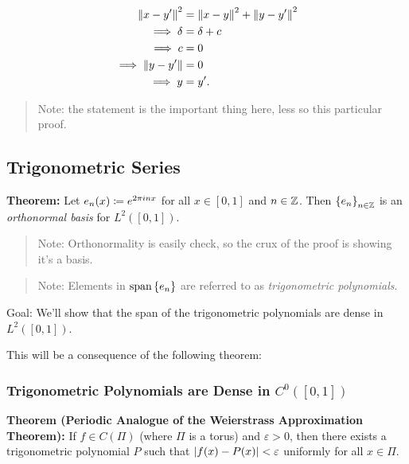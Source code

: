 \begin{align*}
{\left\lVert {x-y'} \right\rVert}^2 &= {\left\lVert {x-y} \right\rVert}^2 + {\left\lVert {y-y'} \right\rVert}^2 \\
\implies \delta &= \delta + c \\
\implies c &= 0 \\
\implies {\left\lVert {y-y'} \right\rVert} &= 0 \\
\implies y &= y'
.\end{align*}

\begin{quote}
Note: the statement is the important thing here, less so this particular
proof.
\end{quote}

\hypertarget{trigonometric-series}{%
\subsection{Trigonometric Series}\label{trigonometric-series}}

\textbf{Theorem:} Let \(e_n(x) \coloneqq e^{2\pi i n x}\) for all
\(x\in [0, 1]\) and \(n\in {\mathbb{Z}}\). Then \(\left\{{e_n}\right\}_{n\in {\mathbb{Z}}}\) is an
\emph{orthonormal basis} for \(L^2([0, 1])\).

\begin{quote}
Note: Orthonormality is easily check, so the crux of the proof is
showing it's a basis.
\end{quote}

\begin{quote}
Note: Elements in \(\mathrm{span}\left\{{e_n}\right\}\) are referred to as
\emph{trigonometric polynomials}.
\end{quote}

Goal: We'll show that the span of the trigonometric polynomials are
dense in \(L^2([0, 1])\).

This will be a consequence of the following theorem:

\hypertarget{trigonometric-polynomials-are-dense-in-c00-1}{%
\subsubsection{\texorpdfstring{Trigonometric Polynomials are Dense in
\(C^0([0, 1])\)}{Trigonometric Polynomials are Dense in C\^{}0({[}0, 1{]})}}\label{trigonometric-polynomials-are-dense-in-c00-1}}

\textbf{Theorem (Periodic Analogue of the Weierstrass Approximation
Theorem):} If \(f\in C(\Pi)\) (where \(\Pi\) is a torus) and
\(\varepsilon > 0\), then there exists a trigonometric polynomial \(P\)
such that \({\left\lvert {f(x) - P(x)} \right\rvert} < \varepsilon\) uniformly for all
\(x\in \Pi\).

